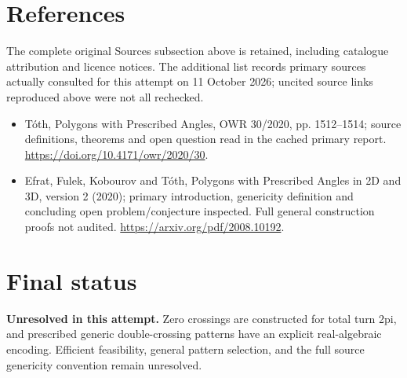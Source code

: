 \documentclass[11pt]{article}
\begin{document}
\section{References}
The complete original Sources subsection above is retained, including catalogue attribution and licence notices. The additional list records primary sources actually consulted for this attempt on 11 October 2026; uncited source links reproduced above were not all rechecked.
\begin{itemize}
\item Tóth, Polygons with Prescribed Angles, OWR 30/2020, pp. 1512--1514; source definitions, theorems and open question read in the cached primary report. \url{https://doi.org/10.4171/owr/2020/30}.
\item Efrat, Fulek, Kobourov and Tóth, Polygons with Prescribed Angles in 2D and 3D, version 2 (2020); primary introduction, genericity definition and concluding open problem/conjecture inspected. Full general construction proofs not audited. \url{https://arxiv.org/pdf/2008.10192}.
\end{itemize}
\section{Final status}
\textbf{Unresolved in this attempt.} Zero crossings are constructed for total turn 2pi, and prescribed generic double-crossing patterns have an explicit real-algebraic encoding. Efficient feasibility, general pattern selection, and the full source genericity convention remain unresolved.
\end{document}
